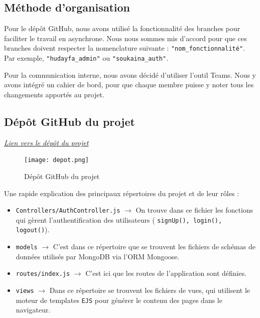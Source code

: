 \documentclass[12pt,a4paper]{article}
\begin{document}
\newpage
		
	\subsection{Méthode d'organisation}
	
	Pour le dépôt GitHub, nous avons utilisé la fonctionnalité des branches pour faciliter le travail en asynchrone. Nous nous sommes mis d'accord pour que ces branches doivent respecter la nomenclature suivante : \texttt{"nom\_fonctionnalité"}. Par exemple, \texttt{"hudayfa\_admin"} ou \texttt{"soukaina\_auth"}. 
	
	Pour la communication interne, nous avons décidé d'utiliser l'outil Teams. Nous y avons intégré un cahier de bord, pour que chaque membre puisse y noter tous les changements apportés au projet.
	


		
		\subsection{Dépôt GitHub du projet}
		
		 \textit{\href{https://github.com/hugolgs-dev/l315-semaine-4-groupe-f}{Lien vers le dépôt du projet}} \\
		 
\begin{figure}[!h]
	\begin{center}
		\texttt{[image: depot.png]}
		\caption{Dépôt GitHub du projet}
	\end{center}
\end{figure}	

\newpage

Une rapide explication des principaux répertoires du projet et de leur rôles : \\
		 
		 \begin{itemize}
			
			\item \texttt{Controllers/AuthController.js} $\rightarrow$ On trouve dans ce fichier les fonctions qui gèrent l'authentification des utilisateurs ( \texttt{signUp(), login(), logout()}).
			
			\item \texttt{models} $\rightarrow$ C'est dans ce répertoire que se trouvent les fichiers de schémas de données utilisés par MongoDB via l'ORM Mongoose. 
			
			\item \texttt{routes/index.js} $\rightarrow$ C'est ici que les routes de l'application sont définies.
			
			\item \texttt{views} $\rightarrow$ Dans ce répertoire se trouvent les fichiers de vues, qui utilisent le moteur de templates \texttt{EJS} pour générer le contenu des pages dans le navigateur. \\
		
		 \end{itemize} 
		 
\end{document}
